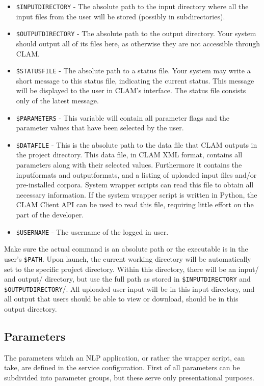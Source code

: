 \documentclass[a4paper,12pt]{report}
\begin{document}
\begin{itemize}
\item \texttt{\$INPUTDIRECTORY} - The absolute path to the input directory where all the input files from the user will be stored (possibly in subdirectories).
\item \texttt{\$OUTPUTDIRECTORY} - The absolute path to the output directory. Your system should output all of its files here, as otherwise they are not accessible through CLAM.
\item \texttt{\$STATUSFILE} - The absolute path to a status file. Your system may write a short message to this status file, indicating the current status. This message will be displayed to the user in CLAM's interface. The status file consists only of the latest message.
\item \texttt{\$PARAMETERS} - This variable will contain all parameter flags and the parameter values that have been selected by the user.
\item \texttt{\$DATAFILE} - This is the absolute path to the data file that CLAM outputs in the project directory. This data file, in CLAM XML format, contains all parameters along with their selected values. Furthermore it contains the inputformats and outputformats, and a listing of uploaded input files and/or pre-installed corpora. System wrapper scripts can read this file to obtain all necessary information. If the system wrapper script is written in Python, the CLAM Client API can be used to read this file, requiring little effort on the part of the developer.
\item \texttt{\$USERNAME} - The username of the logged in user.
\end{itemize}


Make sure the actual command is an absolute path or the executable is in the user's \texttt{\$PATH}. Upon launch, the current working directory will be automatically set to the specific project directory. Within this directory, there will be an input/ and output/ directory, but use the full path as stored in \texttt{\$INPUTDIRECTORY} and \texttt{\$OUTPUTDIRECTORY}/. All uploaded user input will be in this input directory, and all output that users should be able to view or download, should be in this output directory.


\subsection{Parameters}

The parameters which an NLP application, or rather the wrapper script, can take, are defined in the service configuration. First of all parameters can be subdivided into parameter groups, but these serve only presentational purposes. 
\end{document}
